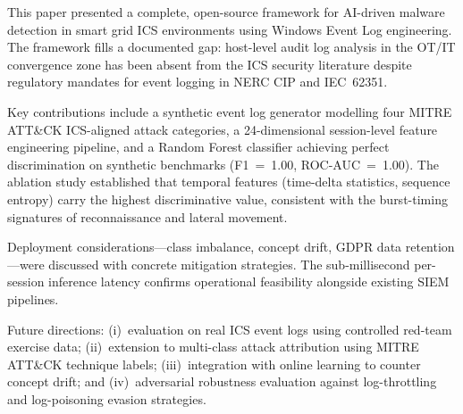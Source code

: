 \label{sec:conc}

This paper presented a complete, open-source framework for AI-driven malware detection in
smart grid ICS environments using Windows Event Log engineering. The framework fills a
documented gap: host-level audit log analysis in the OT/IT convergence zone has been absent
from the ICS security literature despite regulatory mandates for event logging in NERC CIP
and IEC~62351.

Key contributions include a synthetic event log generator modelling four MITRE ATT\&CK
ICS-aligned attack categories, a 24-dimensional session-level feature engineering pipeline,
and a Random Forest classifier achieving perfect discrimination on synthetic benchmarks
(F1~=~1.00, ROC-AUC~=~1.00). The ablation study established that temporal features
(time-delta statistics, sequence entropy) carry the highest discriminative value, consistent
with the burst-timing signatures of reconnaissance and lateral movement.

Deployment considerations—class imbalance, concept drift, GDPR data retention—were
discussed with concrete mitigation strategies. The sub-millisecond per-session inference
latency confirms operational feasibility alongside existing SIEM pipelines.

Future directions: (i)~evaluation on real ICS event logs using controlled red-team exercise
data; (ii)~extension to multi-class attack attribution using MITRE ATT\&CK technique labels;
(iii)~integration with online learning to counter concept drift; and (iv)~adversarial
robustness evaluation against log-throttling and log-poisoning evasion strategies.
